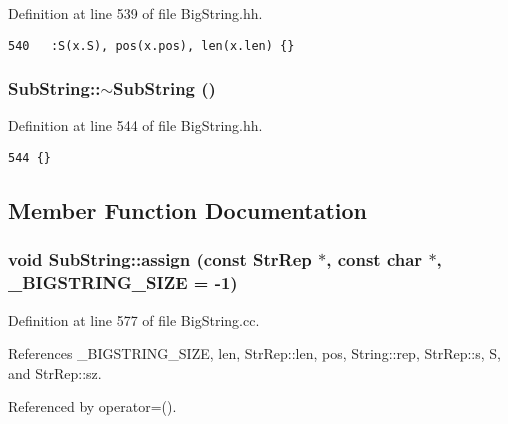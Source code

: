 Definition at line 539 of file Big\-String.hh.



\footnotesize\begin{verbatim}540   :S(x.S), pos(x.pos), len(x.len) {}
\end{verbatim}\normalsize 
{}
\subsubsection{\setlength{\rightskip}{0pt plus 5cm}Sub\-String::$\sim$Sub\-String ()\hspace{0.3cm}{\tt  [inline]}}\label{classSubString_a0}




Definition at line 544 of file Big\-String.hh.



\footnotesize\begin{verbatim}544 {}
\end{verbatim}\normalsize 


\subsection{Member Function Documentation}
\subsubsection{\setlength{\rightskip}{0pt plus 5cm}void Sub\-String::assign (const {\bf Str\-Rep} $\ast$, const char $\ast$, {\bf \_\-BIGSTRING\_\-SIZE} = -1)\hspace{0.3cm}{\tt  [protected]}}\label{classSubString_b0}




Definition at line 577 of file Big\-String.cc.

References \_\-BIGSTRING\_\-SIZE, len, Str\-Rep::len, pos, String::rep, Str\-Rep::s, S, and Str\-Rep::sz.

Referenced by operator=().



